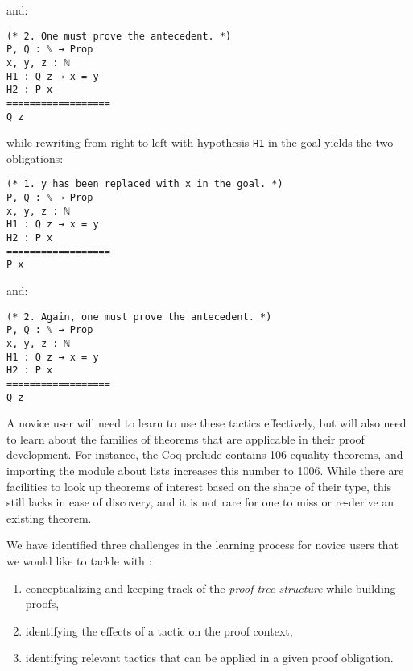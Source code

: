 and:

\begin{verbatim}
(* 2. One must prove the antecedent. *)
P, Q : ℕ → Prop
x, y, z : ℕ
H1 : Q z → x = y
H2 : P x
==================
Q z
\end{verbatim}

while rewriting from right to left with hypothesis \texttt{H1} in the
goal yields the two obligations:

\begin{verbatim}
(* 1. y has been replaced with x in the goal. *)
P, Q : ℕ → Prop
x, y, z : ℕ
H1 : Q z → x = y
H2 : P x
==================
P x
\end{verbatim}

and:

\begin{verbatim}
(* 2. Again, one must prove the antecedent. *)
P, Q : ℕ → Prop
x, y, z : ℕ
H1 : Q z → x = y
H2 : P x
==================
Q z
\end{verbatim}

A novice user will need to learn to use these tactics effectively, but will also
need to learn about the families of theorems that are applicable in their proof
development.  For instance, the Coq prelude contains 106 equality theorems, and
importing the module about lists increases this number to 1006.  While there are
facilities to look up theorems of interest based on the shape of their type,
this still lacks in ease of discovery, and it is not rare for one to miss or
re-derive an existing theorem.


We have identified three challenges in the learning process for novice users
that we would like to tackle with \PeaCoq{}:

\begin{enumerate}

  \item conceptualizing and keeping track of the \emph{proof tree structure}
while building proofs,

  \item identifying the effects of a tactic on the proof context,

  \item identifying relevant tactics that can be applied in a given proof
obligation.

\end{enumerate}
